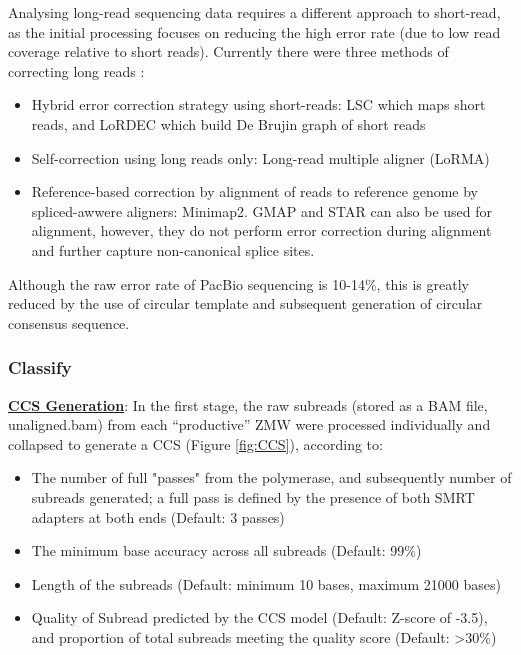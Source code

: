 Analysing long-read sequencing data requires a different approach to short-read, as the initial processing focuses on reducing the high error rate (due to low read coverage relative to short reads). Currently there were three methods of correcting long reads \cite{Zhao2019}: 
\begin{itemize}
	\item Hybrid error correction strategy using short-reads: LSC \cite{Au2012} which maps short reads, and LoRDEC which build De Brujin graph of short reads \cite{Salmela2014}
	\item Self-correction using long reads only: Long-read multiple aligner (LoRMA) \cite{Salmela2017}
	\item Reference-based correction by alignment of reads to reference genome by spliced-awwere aligners: Minimap2. GMAP and STAR can also be used for alignment, however, they do not perform error correction during alignment and further capture non-canonical splice sites.  
\end{itemize}

Although the raw error rate of PacBio sequencing is 10-14\%, this is greatly reduced by the use of circular template and subsequent generation of circular consensus sequence. 

\subsubsection{Classify}
\label{section:classify}

\uline{\textbf{CCS Generation}}: In the first stage, the raw subreads (stored as a BAM file, unaligned.bam) from each “productive” ZMW were processed individually and collapsed to generate a CCS (Figure \ref{fig:CCS}), according to: 
\begin{itemize}
	\item The number of full "passes" from the polymerase, and subsequently number of subreads generated; a full pass is defined by the presence of both SMRT adapters at both ends (Default: 3 passes)
	\item The minimum base accuracy across all subreads (Default: 99\%)
	\item Length of the subreads (Default: minimum 10 bases, maximum 21000 bases)
	\item Quality of Subread predicted by the CCS model (Default: Z-score of -3.5), and proportion of total subreads meeting the quality score (Default: \textgreater 30\%)
\end{itemize}

